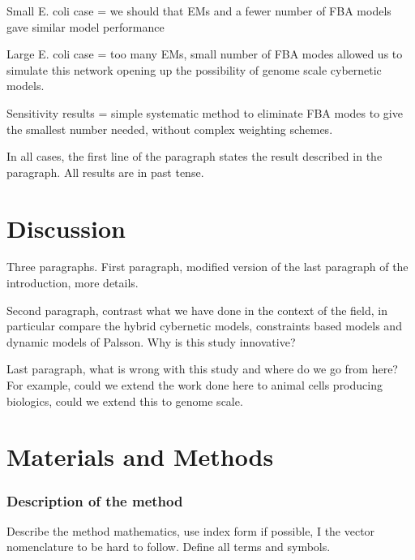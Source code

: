 \documentclass[10pt,twocolumn,twoside,final]{IEEEtran}
\begin{document}
Small E. coli case = we should that EMs and a fewer number of FBA models gave similar model performance

Large E. coli case = too many EMs, small number of FBA modes allowed us to simulate this network opening up the possibility of genome scale cybernetic models.

Sensitivity results = simple systematic method to eliminate FBA modes to give the smallest number needed, without complex weighting schemes.

In all cases, the first line of the paragraph states the result described in the paragraph. All results are in past tense.



\section{Discussion}
Three paragraphs.
First paragraph, modified version of the last paragraph of the introduction, more details.

Second paragraph, contrast what we have done in the context of the field, in particular compare the hybrid cybernetic models, constraints based models and dynamic models of
Palsson. Why is this study innovative?

Last paragraph, what is wrong with this study and where do we go from here? For example,
could we extend the work done here to animal cells producing biologics, could we extend this to genome scale.

\section{Materials and Methods}

\noindent\subsubsection*{Description of the method}
Describe the method mathematics, use index form if possible, I the vector nomenclature to be hard to follow. Define all terms and symbols.
\end{document}
